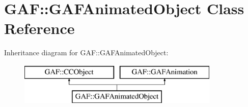 \hypertarget{class_g_a_f_1_1_g_a_f_animated_object}{\section{G\-A\-F\-:\-:G\-A\-F\-Animated\-Object Class Reference}
\label{class_g_a_f_1_1_g_a_f_animated_object}
}
Inheritance diagram for G\-A\-F\-:\-:G\-A\-F\-Animated\-Object\-:\begin{figure}[H]
\begin{center}
\leavevmode
\includegraphics[height=2.000000cm]{class_g_a_f_1_1_g_a_f_animated_object}
\end{center}
\end{figure}
